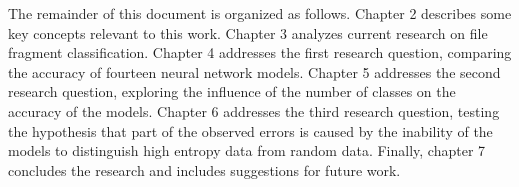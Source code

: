 
The remainder of this document is organized as follows.
Chapter 2 describes some key concepts relevant to this work. 
Chapter 3 analyzes current research on file fragment classification.
Chapter 4 addresses the first research question, comparing the accuracy of fourteen neural network models.
Chapter 5 addresses the second research question, exploring the influence of the number of classes on the accuracy of the models.
Chapter 6 addresses the third research question, testing the hypothesis that part of the observed errors is caused by the inability of the models to distinguish high entropy data from random data.    
Finally, chapter 7 concludes the research and includes suggestions for future work.
